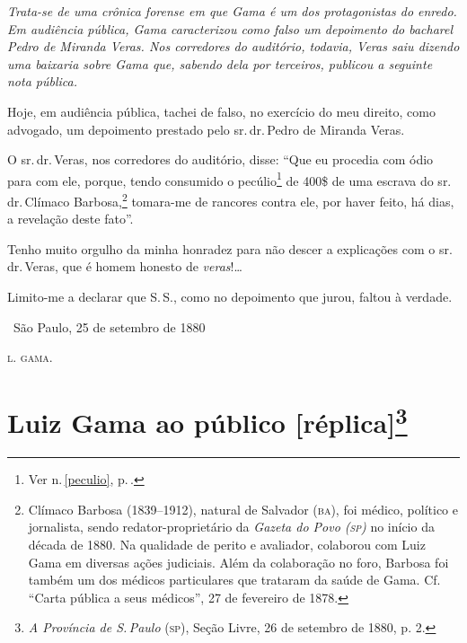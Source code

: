 
\begin{resumo}
\emph{Trata-se de uma crônica forense em que Gama é um dos protagonistas
do enredo. Em audiência pública, Gama caracterizou como falso um
depoimento do bacharel Pedro de Miranda Veras. Nos corredores do
auditório, todavia, Veras saiu dizendo uma baixaria sobre Gama que,
sabendo dela por terceiros, publicou a seguinte nota pública. }
\end{resumo}

Hoje, em audiência pública, tachei de falso, no exercício do meu
direito, como advogado, um depoimento prestado pelo sr.\,dr.\,Pedro de
Miranda Veras.

O sr.\,dr.\,Veras, nos corredores do auditório, disse: ``Que eu procedia
com ódio para com ele, porque, tendo consumido o pecúlio\footnote{
  Ver n.\,\ref{peculio}, p.\,\pageref{peculio}.} de 400\$ de uma escrava do sr.\,dr.\,Clímaco Barbosa,\footnote{Clímaco Barbosa (1839--1912), natural de \label{climaco}
  Salvador (\textsc{ba}), foi médico, político e jornalista, sendo
  redator-proprietário da \emph{Gazeta do Povo (\textsc{sp})} no início da década
  de 1880. Na qualidade de perito e avaliador, colaborou com Luiz Gama
  em diversas ações judiciais. Além da colaboração no foro, Barbosa foi
  também um dos médicos particulares que trataram da saúde de Gama. Cf.
  ``Carta pública a seus médicos'', 27 de fevereiro de 1878.}
tomara-me de rancores
contra ele, por haver feito, há dias, a revelação deste fato''.

Tenho muito orgulho da minha honradez para não descer a explicações com
o sr.\,dr.\,Veras, que é homem honesto de \emph{veras}!\ldots{}

Limito-me a declarar que S.\,S., como no depoimento que jurou, faltou à
verdade.\medskip

\hfill\ São Paulo, 25 de setembro de 1880

\hfill\textsc{l. gama.}

\section{Luiz Gama ao público {[}réplica{]}\protect\footnote{
\emph{\MakeUppercase{A P}rovíncia de \MakeUppercase{S.\,P}aulo} (\textsc{sp}), \MakeUppercase{S}eção \MakeUppercase{L}ivre, 26 de setembro de 1880, p. 2.}}


